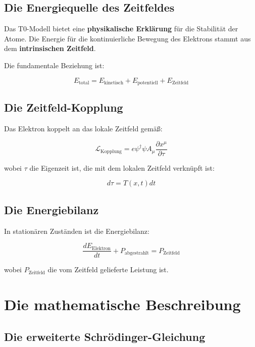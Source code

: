 \documentclass[12pt,a4paper]{report}
\begin{document}
\subsection{Die Energiequelle des Zeitfeldes}

Das T0-Modell bietet eine \textbf{physikalische Erklärung} für die Stabilität der Atome. Die Energie für die kontinuierliche Bewegung des Elektrons stammt aus dem \textbf{intrinsischen Zeitfeld}.

Die fundamentale Beziehung ist:

\begin{equation}
	E_{\text{total}} = E_{\text{kinetisch}} + E_{\text{potentiell}} + E_{\text{Zeitfeld}}
\end{equation}

\subsection{Die Zeitfeld-Kopplung}

Das Elektron koppelt an das lokale Zeitfeld gemäß:

\begin{equation}
	\mathcal{L}_{\text{Kopplung}} = e\psi^\dagger\psi A_\mu \frac{\partial x^\mu}{\partial \tau}
\end{equation}

wobei $\tau$ die Eigenzeit ist, die mit dem lokalen Zeitfeld verknüpft ist:

\begin{equation}
	d\tau = T(x,t) dt
\end{equation}

\subsection{Die Energiebilanz}

In stationären Zuständen ist die Energiebilanz:

\begin{equation}
	\frac{dE_{\text{Elektron}}}{dt} + P_{\text{abgestrahlt}} = P_{\text{Zeitfeld}}
\end{equation}

wobei $P_{\text{Zeitfeld}}$ die vom Zeitfeld gelieferte Leistung ist.

\section{Die mathematische Beschreibung}

\subsection{Die erweiterte Schrödinger-Gleichung}
\end{document}
